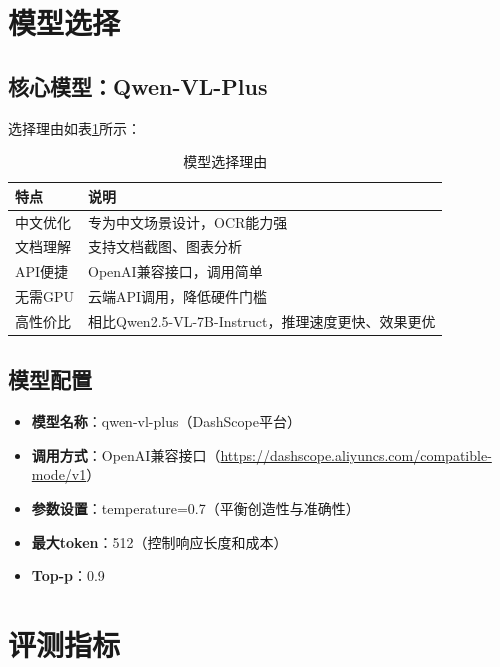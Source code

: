 \section{模型选择}
\label{sec:model_selection}

\subsection{核心模型：Qwen-VL-Plus}

选择理由如表\ref{tab:model_reasons}所示：

\begin{table}[htbp]
  \centering
  \caption{模型选择理由}
  \label{tab:model_reasons}
  \begin{tabular}{|l|l|}
    \hline
    \textbf{特点} & \textbf{说明} \\
    \hline
    中文优化 & 专为中文场景设计，OCR能力强 \\
    \hline
    文档理解 & 支持文档截图、图表分析 \\
    \hline
    API便捷 & OpenAI兼容接口，调用简单 \\
    \hline
    无需GPU & 云端API调用，降低硬件门槛 \\
    \hline
    高性价比 & 相比Qwen2.5-VL-7B-Instruct，推理速度更快、效果更优 \\
    \hline
  \end{tabular}
\end{table}

\subsection{模型配置}

\begin{itemize}
  \item \textbf{模型名称}：qwen-vl-plus（DashScope平台）
  \item \textbf{调用方式}：OpenAI兼容接口（\url{https://dashscope.aliyuncs.com/compatible-mode/v1}）
  \item \textbf{参数设置}：temperature=0.7（平衡创造性与准确性）
  \item \textbf{最大token}：512（控制响应长度和成本）
  \item \textbf{Top-p}：0.9
\end{itemize}

\section{评测指标}
\label{sec:metrics}

